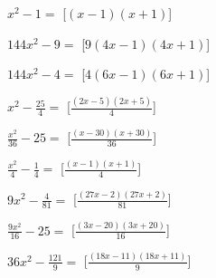 \begin{esercizio}
\begin{multicols}{2}
\begin{enumeratea}
\item \(x^{2} - 1=\) 
\hfill [\(\left(x - 1\right) \left(x + 1\right)\)]
\item \(144 x^{2} - 9=\) 
\hfill [\(9 \left(4 x - 1\right) \left(4 x + 1\right)\)]
\item \(144 x^{2} - 4=\) 
\hfill [\(4 \left(6 x - 1\right) \left(6 x + 1\right)\)]
\item \(x^{2} - \frac{25}{4}=\) 
\hfill [\(\frac{\left(2 x - 5\right) \left(2 x + 5\right)}{4}\)]
\item \(\frac{x^{2}}{36} - 25=\) 
\hfill [\(\frac{\left(x - 30\right) \left(x + 30\right)}{36}\)]
\item \(\frac{x^{2}}{4} - \frac{1}{4}=\) 
\hfill [\(\frac{\left(x - 1\right) \left(x + 1\right)}{4}\)]
\item \(9 x^{2} - \frac{4}{81}=\) 
\hfill [\(\frac{\left(27 x - 2\right) \left(27 x + 2\right)}{81}\)]
\item \(\frac{9 x^{2}}{16} - 25=\) 
\hfill [\(\frac{\left(3 x - 20\right) \left(3 x + 20\right)}{16}\)]
\item \(36 x^{2} - \frac{121}{9}=\) 
\hfill [\(\frac{\left(18 x - 11\right) \left(18 x + 11\right)}{9}\)]

\end{enumeratea}
\end{multicols}
\end{esercizio}
